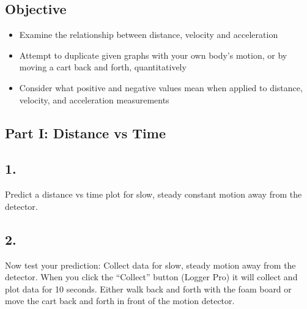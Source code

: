     \subsection*{Objective}

    \begin{itemize}
        \item Examine the relationship between distance, velocity and acceleration
        \item Attempt to duplicate given graphs with your own body's motion, or by moving a cart back and forth, quantitatively
        \item Consider what positive and negative values mean when applied to distance, velocity, and acceleration measurements
        
    \end{itemize}

    \subsection*{Part I: Distance vs Time}

    \subsection*{1.}
    Predict a distance vs time plot for slow, steady constant motion away from the detector.

    \begin{mdframed}
        \centering{}
    \end{mdframed}

    \subsection*{2.}
    Now test your prediction: Collect data for slow, steady motion away from the detector. When you click the “Collect” button (Logger Pro) it will collect and plot data for 10 seconds. Either walk back and forth with the foam board or move the cart back and forth in front of the motion detector.

